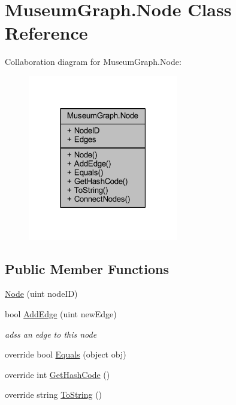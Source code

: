 \hypertarget{class_museum_graph_1_1_node}{}\section{Museum\+Graph.\+Node Class Reference}
\label{class_museum_graph_1_1_node}


Collaboration diagram for Museum\+Graph.\+Node\+:\nopagebreak
\begin{figure}[H]
\begin{center}
\leavevmode
\includegraphics[width=186pt]{class_museum_graph_1_1_node__coll__graph}
\end{center}
\end{figure}
\subsection*{Public Member Functions}
\begin{DoxyCompactItemize}
\item 
\mbox{\hyperlink{class_museum_graph_1_1_node_a917a203c77b5aa5e65c7293ba896d2c1}{Node}} (uint node\+ID)
\item 
bool \mbox{\hyperlink{class_museum_graph_1_1_node_adecbc3b471d15c5480d4c13e9502ac27}{Add\+Edge}} (uint new\+Edge)
\begin{DoxyCompactList}\small\item\em adss an edge to this node \end{DoxyCompactList}\item 
override bool \mbox{\hyperlink{class_museum_graph_1_1_node_a341a560512b816a8af059813480ef9da}{Equals}} (object obj)
\item 
override int \mbox{\hyperlink{class_museum_graph_1_1_node_adcc32750b64d61121c1431ffc41b0f8d}{Get\+Hash\+Code}} ()
\item 
override string \mbox{\hyperlink{class_museum_graph_1_1_node_a3bfacc4d5a119f353c81b197ad6a4642}{To\+String}} ()
\end{DoxyCompactItemize}
